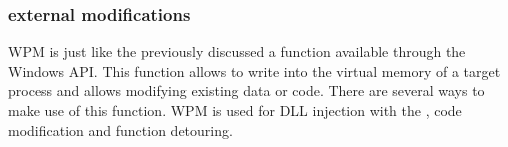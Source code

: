 \subsubsection{ external modifications}
\gls{WPM} is just like the previously discussed  a function available through the Windows \gls{API}. This function allows to write into the virtual memory of a target process and allows modifying existing data or code. There are several ways to make use of this function. \gls{WPM} is used for \gls{DLL} injection with the , code modification and function detouring. 


